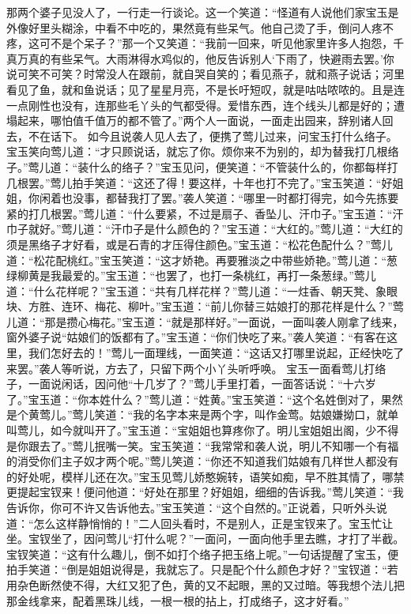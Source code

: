 \documentclass[12pt,oneside]{book}
\begin{document}
那两个婆子见没人了，一行走一行谈论。这一个笑道：“怪道有人说他们家宝玉是外像好里头糊涂，中看不中吃的，果然竟有些呆气。他自己烫了手，倒问人疼不疼，这可不是个呆子？”那一个又笑道：“我前一回来，听见他家里许多人抱怨，千真万真的有些呆气。大雨淋得水鸡似的，他反告诉别人‘下雨了，快避雨去罢。’你说可笑不可笑？时常没人在跟前，就自哭自笑的；看见燕子，就和燕子说话；河里看见了鱼，就和鱼说话；见了星星月亮，不是长吁短叹，就是咕咕哝哝的。且是连一点刚性也没有，连那些毛丫头的气都受得。爱惜东西，连个线头儿都是好的；遭塌起来，哪怕值千值万的都不管了。”两个人一面说，一面走出园来，辞别诸人回去，不在话下。
如今且说袭人见人去了，便携了莺儿过来，问宝玉打什么络子。宝玉笑向莺儿道：“才只顾说话，就忘了你。烦你来不为别的，却为替我打几根络子。”莺儿道：“装什么的络子？”宝玉见问，便笑道：“不管装什么的，你都每样打几根罢。”莺儿拍手笑道：“这还了得！要这样，十年也打不完了。”宝玉笑道：“好姐姐，你闲着也没事，都替我打了罢。”袭人笑道：“哪里一时都打得完，如今先拣要紧的打几根罢。”莺儿道：“什么要紧，不过是扇子、香坠儿、汗巾子。”宝玉道：“汗巾子就好。”莺儿道：“汗巾子是什么颜色的？”宝玉道：“大红的。”莺儿道：“大红的须是黑络子才好看，或是石青的才压得住颜色。”宝玉道：“松花色配什么？”莺儿道：“松花配桃红。”宝玉笑道：“这才娇艳。再要雅淡之中带些娇艳。”莺儿道：“葱绿柳黄是我最爱的。”宝玉道：“也罢了，也打一条桃红，再打一条葱绿。”莺儿道：“什么花样呢？”宝玉道：“共有几样花样？”莺儿道：“一炷香、朝天凳、象眼块、方胜、连环、梅花、柳叶。”宝玉道：“前儿你替三姑娘打的那花样是什么？”莺儿道：“那是攒心梅花。”宝玉道：“就是那样好。”一面说，一面叫袭人刚拿了线来，窗外婆子说“姑娘们的饭都有了。”宝玉道：“你们快吃了来。”袭人笑道：“有客在这里，我们怎好去的！”莺儿一面理线，一面笑道：“这话又打哪里说起，正经快吃了来罢。”袭人等听说，方去了，只留下两个小丫头听呼唤。
宝玉一面看莺儿打络子，一面说闲话，因问他“十几岁了？”莺儿手里打着，一面答话说：“十六岁了。”宝玉道：“你本姓什么？”莺儿道：“姓黄。”宝玉笑道：“这个名姓倒对了，果然是个黄莺儿。”莺儿笑道：“我的名字本来是两个字，叫作金莺。姑娘嫌拗口，就单叫莺儿，如今就叫开了。”宝玉道：“宝姐姐也算疼你了。明儿宝姐姐出阁，少不得是你跟去了。”莺儿抿嘴一笑。宝玉笑道：“我常常和袭人说，明儿不知哪一个有福的消受你们主子奴才两个呢。”莺儿笑道：“你还不知道我们姑娘有几样世人都没有的好处呢，模样儿还在次。”宝玉见莺儿娇憨婉转，语笑如痴，早不胜其情了，哪禁更提起宝钗来！便问他道：“好处在那里？好姐姐，细细的告诉我。”莺儿笑道：“我告诉你，你可不许又告诉他去。”宝玉笑道：“这个自然的。”正说着，只听外头说道：“怎么这样静悄悄的！”二人回头看时，不是别人，正是宝钗来了。宝玉忙让坐。宝钗坐了，因问莺儿“打什么呢？”一面问，一面向他手里去瞧，才打了半截。宝钗笑道：“这有什么趣儿，倒不如打个络子把玉络上呢。”一句话提醒了宝玉，便拍手笑道：“倒是姐姐说得是，我就忘了。只是配个什么颜色才好？”宝钗道：“若用杂色断然使不得，大红又犯了色，黄的又不起眼，黑的又过暗。等我想个法儿把那金线拿来，配着黑珠儿线，一根一根的拈上，打成络子，这才好看。”
\end{document}
